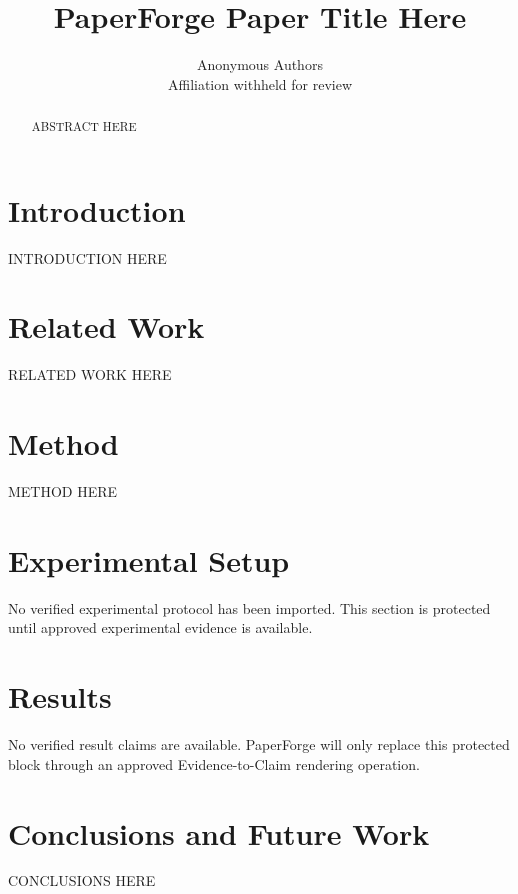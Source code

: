 \documentclass{article} %
\title{PaperForge Paper Title Here}
\author{Anonymous Authors\\
Affiliation withheld for review\\
}
\begin{document}
\maketitle

\begin{abstract}
ABSTRACT HERE
\end{abstract}

\section{Introduction}
\label{sec:intro}
INTRODUCTION HERE

\section{Related Work}
\label{sec:related}
RELATED WORK HERE

\section{Method}
\label{sec:method}
METHOD HERE

\section{Experimental Setup}
\label{sec:experimental}
No verified experimental protocol has been imported. This section is protected
until approved experimental evidence is available.

\section{Results}
\label{sec:results}
No verified result claims are available. PaperForge will only replace this
protected block through an approved Evidence-to-Claim rendering operation.

\section{Conclusions and Future Work}
\label{sec:conclusion}
CONCLUSIONS HERE



\end{document}
